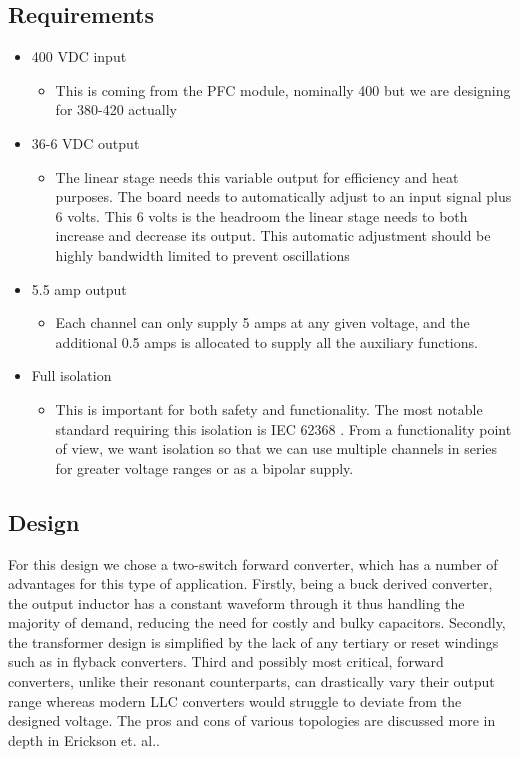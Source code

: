 \documentclass[12pt]{article}
\begin{document}
\subsection{Requirements}
\begin{itemize}
\item 400 VDC input \begin{itemize}
    \item This is coming from the PFC module, nominally 400 but we are designing for 380-420 actually
\end{itemize}
\item 36-6 VDC output \begin{itemize}
    \item The linear stage needs this variable output for efficiency and heat purposes. The board needs to automatically adjust to an input signal plus 6 volts. This 6 volts is the headroom the linear stage needs to both increase and decrease its output. This automatic adjustment should be highly bandwidth limited to prevent oscillations
\end{itemize}
\item 5.5 amp output \begin{itemize}
    \item Each channel can only supply 5 amps at any given voltage, and the additional 0.5 amps is allocated to supply all the auxiliary functions.

\end{itemize}
\item Full isolation \begin{itemize}
    \item This is important for both safety and functionality. The most notable standard requiring this isolation is IEC 62368 \cite{5}. From a functionality point of view, we want isolation so that we can use multiple channels in series for greater voltage ranges or as a bipolar supply.
\end{itemize}
\end{itemize}
\subsection{Design} 
For this design we chose a two-switch forward converter, which has a number of advantages for this type of application. Firstly, being a buck derived converter, the output inductor has a constant waveform through it thus handling the majority of demand, reducing the need for costly and bulky capacitors. Secondly, the transformer design is simplified by the lack of any tertiary or reset windings such as in flyback converters. Third and possibly most critical, forward converters, unlike their resonant counterparts, can drastically vary their output range whereas modern LLC converters would struggle to deviate from the designed voltage.  The pros and cons of various topologies are discussed more in depth in Erickson et. al.\cite{2}.\\
\end{document}
